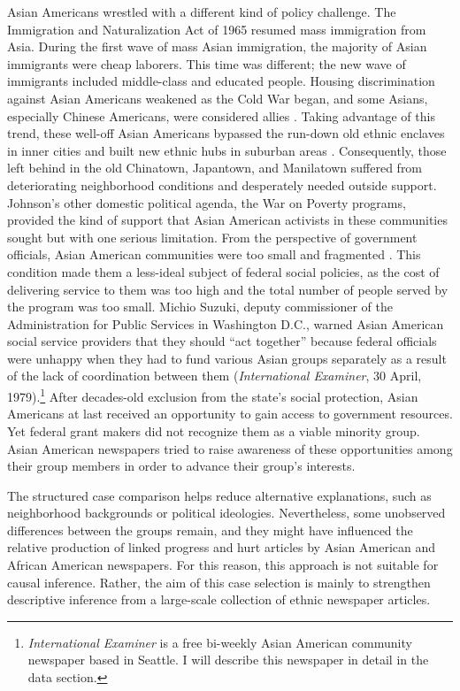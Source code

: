 \documentclass[12 pt]{article}
\begin{document}
Asian Americans wrestled with a different kind of policy challenge. The Immigration and Naturalization Act of 1965 resumed mass immigration from Asia. During the first wave of mass Asian immigration, the majority of Asian immigrants were cheap laborers. This time was different; the new wave of immigrants included middle-class and educated people. Housing discrimination against Asian Americans weakened as the Cold War began, and some Asians, especially Chinese Americans, were considered allies \citep{brooks2009alien}. Taking advantage of this trend, these well-off Asian Americans bypassed the run-down old ethnic enclaves in inner cities and built new ethnic hubs in suburban areas \citep{kwong1996new, lai2003downtown, li2006urban, zhou2010chinatown}. Consequently, those left behind in the old Chinatown, Japantown, and Manilatown suffered from deteriorating neighborhood conditions and desperately needed outside support. Johnson's other domestic political agenda, the War on Poverty programs, provided the kind of support that Asian American activists in these communities sought but with one serious limitation. From the perspective of government officials, Asian American communities were too small and fragmented \citep{kuramoto1976lessons}. This condition made them a less-ideal subject of federal social policies, as the cost of delivering service to them was too high and the total number of people served by the program was too small. Michio Suzuki, deputy commissioner of the Administration for Public Services in Washington D.C., warned Asian American social service providers that they should “act together” because federal officials were unhappy when they had to fund various Asian groups separately as a result of the lack of coordination between them (\textit{International Examiner}, 30 April, 1979).\footnote{\textit{International Examiner} is a free bi-weekly Asian American community newspaper based in Seattle. I will describe this newspaper in detail in the data section.} After decades-old exclusion from the state's social protection, Asian Americans at last received an opportunity to gain access to government resources. Yet federal grant makers did not recognize them as a viable minority group. Asian American newspapers tried to raise awareness of these opportunities among their group members in order to advance their group's interests. 

The structured case comparison helps reduce alternative explanations, such as neighborhood backgrounds or political ideologies. Nevertheless, some unobserved differences between the groups remain, and they might have influenced the relative production of linked progress and hurt articles by Asian American and African American newspapers. For this reason, this approach is not suitable for causal inference. Rather, the aim of this case selection is mainly to strengthen descriptive inference from a large-scale collection of ethnic newspaper articles.
\end{document}
